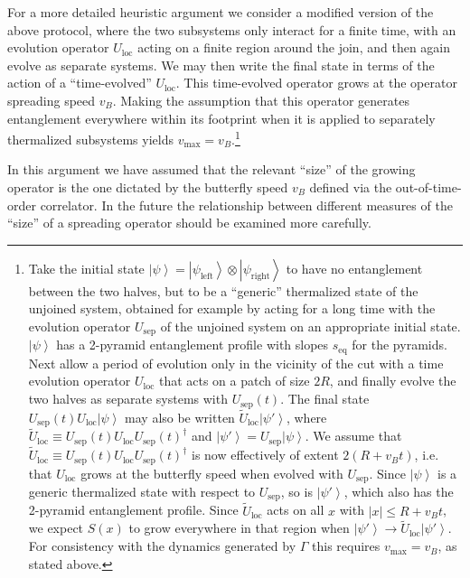 \documentclass[aps,prx,twocolumn,superscriptaddress,floatfix,nofootinbib,prx]{revtex4}
\renewcommand{\>}{\right\rangle}
\newcommand{\<}{\left\langle}
\newcommand{\ket}[1]{\left| #1 \>}
\newcommand{\seq}{s_\text{eq}}
\begin{document}
For a  more detailed heuristic argument we consider a modified version of the above protocol, where the two subsystems only interact for a finite time, with an evolution operator $U_\text{loc}$ acting on a finite region around the join, and then again evolve as separate systems. We may then write the final state in terms of the action of a ``time-evolved'' $U_\text{loc}$. This time-evolved operator grows at the operator spreading speed $v_B$. Making the assumption that this operator generates entanglement everywhere within its footprint when it is applied to separately thermalized subsystems yields $v_\text{max} = v_B$.\footnote{Take the initial state $\ket{\psi}=\ket{\psi_\text{left}}\otimes \ket{\psi_\text{right}}$ to have no entanglement between the two halves, but to be a ``generic'' thermalized state of the unjoined system, obtained for example by acting for a long time with the evolution operator $U_\text{sep}$ of the unjoined system on an appropriate initial state. $\ket{\psi}$ has a 2-pyramid entanglement profile with slopes $\seq$ for the pyramids. Next allow a period of evolution only in the vicinity of the cut with a time evolution operator $U_\text{loc}$ that acts on a patch of size $2R$, and finally evolve the two halves as separate systems with $U_\text{sep}(t)$. The final state $U_\text{sep}(t) U_\text{loc} \ket{\psi}$ may also be written $\widetilde U_\text{loc} \ket{\psi'}$, where $\widetilde U_\text{loc} \equiv U_\text{sep}(t) U_\text{loc} U_\text{sep}(t)^\dag$ and ${\ket{\psi'} = U_\text{sep} \ket{\psi}}$. We assume that $\widetilde U_\text{loc} \equiv U_\text{sep}(t) U_\text{loc} U_\text{sep}(t)^\dag$ is now effectively of extent $2 (R+ v_B t)$, i.e. that $U_\text{loc}$ grows at the butterfly speed when evolved with $U_\text{sep}$. Since $\ket{\psi}$ is a generic thermalized state with respect to $U_\text{sep}$, so is $\ket{\psi'}$, which also has the 2-pyramid entanglement profile. Since $\widetilde U_\text{loc}$ acts on all $x$ with $|x|\leq R+v_Bt$, we expect $S(x)$ to grow everywhere in that region when $\ket{\psi'}\rightarrow \widetilde U_\text{loc} \ket{\psi'}$. For consistency with the dynamics generated by $\Gamma$ this requires $v_\text{max}=v_B$, as stated above.} 

In this  argument we have assumed that the relevant ``size'' of the growing operator is the one dictated by the butterfly speed $v_B$ defined via the out-of-time-order correlator. 
In the future the relationship between different measures of the ``size'' of a spreading operator should be examined more carefully.
\end{document}
